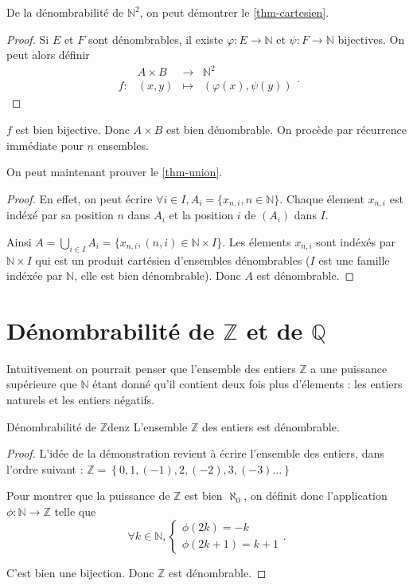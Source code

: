 \documentclass[a4paper,french,final]{memoir}
\begin{document}
De la dénombrabilité de $\mathbb{N}^2$, on peut démontrer le \cref{thm-cartesien}. 

\begin{proof}
	Si $E$ et $F$ sont dénombrables, il existe $\varphi : E \to \mathbb{N}$ et $\psi : F \to \mathbb{N}$ bijectives. On peut alors définir \[ \begin{array}{cccc}
	\ & A \times B & \to & \mathbb{N}^2 \\
	f : & (x,y) & \mapsto & (\varphi(x), \psi(y))
	\end{array}.\]
	
\end{proof}

$f $ est bien bijective. Donc $A \times B$ est bien dénombrable. On procède par récurrence immédiate pour $n$ ensembles. 

On peut maintenant prouver le \cref{thm-union}. 


\begin{proof}
	En effet, on peut écrire $\forall i \in I, A_i = \{x_{n,i}, n \in \mathbb{N}\}$. Chaque élement $x_{n, i}$ est indéxé par sa position $n$ dans $A_i$ et la position $i$ de $(A_i)$ dans $I$. 
	
	Ainsi $A = \bigcup_{i \in I} A_i = \{x_{n, i}, (n,i) \in \mathbb{N} \times I\}$. Les élements $x_{n,i}$ sont indéxés par $\mathbb{N} \times I$ qui est un produit cartésien d'ensembles dénombrables ($I$ est une famille indéxée par $\mathbb{N}$, elle est bien dénombrable). Donc $A$ est dénombrable.
\end{proof}


\section{\texorpdfstring{Dénombrabilité de $\mathbb{Z}$ et de $\mathbb{Q}$}{}}

Intuitivement on pourrait penser que l'ensemble des entiers $\mathbb{Z}$ a une puissance supérieure que $\mathbb{N}$ étant donné qu'il contient deux fois plus d'élements : les entiers naturels et les entiers négatifs. 

\begin{theoremb}{Dénombrabilité de $\mathbb{Z}$}{denz}
	L'ensemble $\mathbb{Z}$ des entiers est dénombrable. 
\end{theoremb}

\begin{proof}
L'idée de la démonstration revient à écrire l'ensemble des entiers, dans l'ordre suivant :  $\mathbb{Z}=\left\lbrace 0,1,(-1),2,(-2),3,(-3) \dots\right\rbrace$ 

	Pour montrer que la puissance de $\mathbb{Z}$ est bien $\aleph_0$, on définit donc l'application $\phi : \mathbb{N} \to \mathbb{Z}$ telle que \[ \forall k \in \mathbb{N}, \left\lbrace \begin{array}{c}
	\phi(2k) = -k \\
	\phi(2k + 1) = k+1
	\end{array} \right. .\]
	
	C'est bien une bijection. Donc $\mathbb{Z}$ est dénombrable. 
\end{proof}
\end{document}
